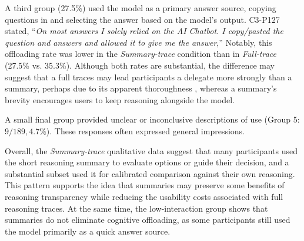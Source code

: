 \documentclass[acmlarge,review=true, anonymous=true]{acmart}
\newcommand{\daniela}[1]{\textcolor{colordaniela}{\textbf{\faComment~Daniela:} #1}}
\begin{document}
A third group (27.5\%) used the model as a primary answer source, copying questions in and selecting the answer based on the model's output. C3-P127 stated, ``\textit{On most answers I solely relied on the AI Chatbot. I copy/pasted the question and answers and allowed it to give me the answer},'' Notably, this offloading rate was lower in the \textit{Summary-trace} condition than in \textit{Full-trace} (27.5\% vs. 35.3\%). Although both rates are substantial, the difference may suggest that a full traces may lead participants a delegate more strongly than a summary, perhaps due to its apparent thoroughness \cite{10.1145/3397481.3450639, eiband2019impact}, whereas a summary's brevity encourages users to keep reasoning alongside the model.



A small final group provided unclear or inconclusive descriptions of use (Group 5: $9/189, 4.7\%$). These responses often expressed general impressions. %

Overall, the \textit{Summary-trace} qualitative data suggest that many participants used the short reasoning summary to evaluate options or guide their decision, and a substantial subset used it for calibrated comparison against their own reasoning. This pattern supports the idea that summaries may preserve some benefits of reasoning transparency while reducing the usability costs associated with full reasoning traces. At the same time, the low-interaction group shows that summaries do not eliminate cognitive offloading, as some participants still used the model primarily as a quick answer source. %
\end{document}
